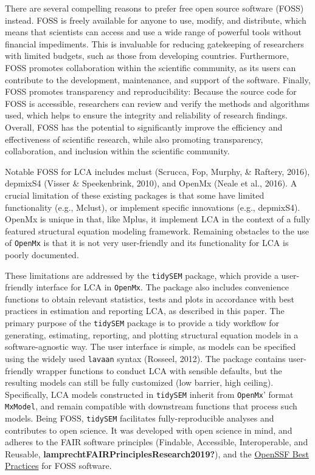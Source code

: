 \documentclass[
  ,man,floatsintext]{apa6}
\begin{document}
There are several compelling reasons to prefer free open source software
(FOSS) instead. FOSS is freely available for anyone to use, modify, and
distribute, which means that scientists can access and use a wide range
of powerful tools without financial impediments. This is invaluable for
reducing gatekeeping of researchers with limited budgets, such as those
from developing countries. Furthermore, FOSS promotes collaboration
within the scientific community, as its users can contribute to the
development, maintenance, and support of the software. Finally, FOSS
promotes transparency and reproducibility: Because the source code for
FOSS is accessible, researchers can review and verify the methods and
algorithms used, which helps to ensure the integrity and reliability of
research findings. Overall, FOSS has the potential to significantly
improve the efficiency and effectiveness of scientific research, while
also promoting transparency, collaboration, and inclusion within the
scientific community.

Notable FOSS for LCA includes mclust (Scrucca, Fop, Murphy, \& Raftery, 2016), depmixS4
(Visser \& Speekenbrink, 2010), and OpenMx (Neale et al., 2016). A crucial limitation of
these existing packages is that some have limited functionality (e.g.,
Mclust), or implement specific innovations (e.g., depmixS4). OpenMx is
unique in that, like Mplus, it implement LCA in the context of a fully
featured structural equation modeling framework. Remaining obstacles to
the use of \texttt{OpenMx} is that it is not very user-friendly and its
functionality for LCA is poorly documented.

These limitations are addressed by the \texttt{tidySEM} package, which provide
a user-friendly interface for LCA in \texttt{OpenMx}. The package also includes
convenience functions to obtain relevant statistics, tests and plots in
accordance with best practices in estimation and reporting LCA, as
described in this paper. The primary purpose of the \texttt{tidySEM} package is
to provide a tidy workflow for generating, estimating, reporting, and
plotting structural equation models in a software-agnostic way. The user
interface is simple, as models can be specified using the widely used
\texttt{lavaan} syntax (Rosseel, 2012). The package contains
user-friendly wrapper functions to conduct LCA with sensible defaults,
but the resulting models can still be fully customized (low barrier,
high ceiling). Specifically, LCA models constructed in \texttt{tidySEM} inherit
from \texttt{OpenMx}' format \texttt{MxModel}, and remain compatible with downstream
functions that process such models. Being FOSS, \texttt{tidySEM} facilitates
fully-reproducible analyses and contributes to open science. It was
developed with open science in mind, and adheres to the FAIR software
principles (Findable, Accessible, Interoperable, and Reusable, \textbf{lamprechtFAIRPrinciplesResearch2019?}), and the \href{https://bestpractices.coreinfrastructure.org/en/criteria}{OpenSSF Best
Practices} for
FOSS software.
\end{document}
